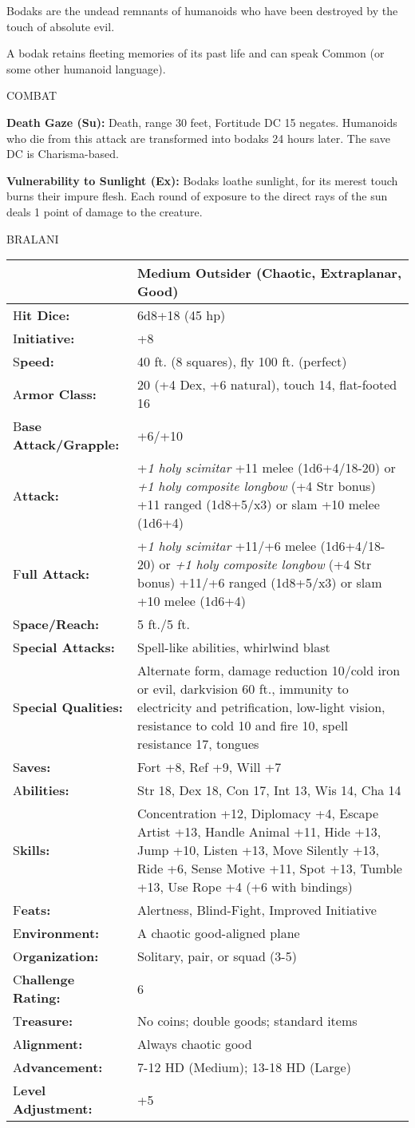 \documentclass{article}
\begin{document}
Bodaks are the undead remnants of humanoids who have been destroyed by the touch 
of absolute evil.

A bodak retains fleeting memories of its past life and can speak Common (or some 
other humanoid language).

COMBAT

\textbf{Death Gaze (Su):} Death, range 30 feet, Fortitude DC 15 negates. Humanoids 
who die from this attack are transformed into bodaks 24 hours later. The save DC 
is Charisma-based.

\textbf{Vulnerability to Sunlight (Ex):} Bodaks loathe sunlight, for its merest 
touch burns their impure flesh. Each round of exposure to the direct rays of the 
sun deals 1 point of damage to the creature.

\vspace{12pt}
{\LARGE{}BRALANI}

\begin{tabular}{|>{\raggedright}p{91pt}|>{\raggedright}p{226pt}|}
\hline
  & Medium Outsider (Chaotic, Extraplanar, Good)\tabularnewline
\hline
H\textbf{it Dice:} & 6d8+18 (45 hp)\tabularnewline
\hline
I\textbf{nitiative:} & +8\tabularnewline
\hline
S\textbf{peed:} & 40 ft. (8 squares), fly 100 ft. (perfect)\tabularnewline
\hline
A\textbf{rmor Class:} & 20 (+4 Dex, +6 natural), touch 14, flat-footed 16\tabularnewline
\hline
B\textbf{ase Attack/Grapple:} & +6/+10\tabularnewline
\hline
A\textbf{ttack:} & +\textit{1 holy scimitar }+11 melee (1d6+4/18-20) or \textit{+1 
holy composite longbow }(+4 Str bonus) +11 ranged (1d8+5/x3) or slam +10 melee 
(1d6+4)\tabularnewline
\hline
F\textbf{ull Attack:} & +\textit{1 holy scimitar }+11/+6 melee (1d6+4/18-20) or 
\textit{+1 holy composite longbow }(+4 Str bonus) +11/+6 ranged (1d8+5/x3) or slam 
+10 melee (1d6+4)\tabularnewline
\hline
S\textbf{pace/Reach:} & 5 ft./5 ft.\tabularnewline
\hline
S\textbf{pecial Attacks:} & Spell-like abilities, whirlwind blast\tabularnewline
\hline
S\textbf{pecial Qualities:} & Alternate form, damage reduction 10/cold iron or 
evil, darkvision 60 ft., immunity to electricity and petrification, low-light vision, 
resistance to cold 10 and fire 10, spell resistance 17, tongues\tabularnewline
\hline
S\textbf{aves:} & Fort +8, Ref +9, Will +7\tabularnewline
\hline
A\textbf{bilities:} & Str 18, Dex 18, Con 17, Int 13, Wis 14, Cha 14\tabularnewline
\hline
S\textbf{kills:} & Concentration +12, Diplomacy +4, Escape Artist +13, Handle Animal 
+11, Hide +13, Jump +10, Listen +13, Move Silently +13, Ride +6, Sense Motive +11, 
Spot +13, Tumble +13, Use Rope +4 (+6 with bindings)\tabularnewline
\hline
F\textbf{eats:} & Alertness, Blind-Fight, Improved Initiative\tabularnewline
\hline
E\textbf{nvironment:} & A chaotic good-aligned plane\tabularnewline
\hline
O\textbf{rganization:} & Solitary, pair, or squad (3-5)\tabularnewline
\hline
C\textbf{hallenge Rating:} & 6\tabularnewline
\hline
T\textbf{reasure:} & No coins; double goods; standard items\tabularnewline
\hline
A\textbf{lignment:} & Always chaotic good\tabularnewline
\hline
A\textbf{dvancement:} & 7-12 HD (Medium); 13-18 HD (Large)\tabularnewline
\hline
L\textbf{evel Adjustment:} & +5\tabularnewline
\hline
\end{tabular}
\end{document}
